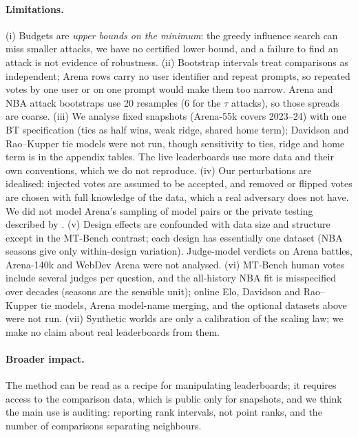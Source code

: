 \documentclass{article}
\begin{document}
\paragraph{Limitations.}
(i) Budgets are \emph{upper bounds on the minimum}: the greedy influence search can miss smaller attacks, we have no certified lower bound, and a failure to find an attack is not evidence of robustness.
(ii) Bootstrap intervals treat comparisons as independent; Arena rows carry no user identifier and repeat prompts, so repeated votes by one user or on one prompt would make them too narrow. Arena and NBA attack bootstraps use 20 resamples (6 for the $\tau$ attacks), so those spreads are coarse.
(iii) We analyse fixed snapshots (Arena-55k covers 2023--24) with one BT specification (ties as half wins, weak ridge, shared home term); Davidson and Rao--Kupper tie models were not run, though sensitivity to ties, ridge and home term is in the appendix tables. The live leaderboards use more data and their own conventions, which we do not reproduce.
(iv) Our perturbations are idealised: injected votes are assumed to be accepted, and removed or flipped votes are chosen with full knowledge of the data, which a real adversary does not have. We did not model Arena's sampling of model pairs or the private testing described by \citet{singh2025illusion}.
(v) Design effects are confounded with data size and structure except in the MT-Bench contrast; each design has essentially one dataset (NBA seasons give only within-design variation). Judge-model verdicts on Arena battles, Arena-140k and WebDev Arena were not analysed.
(vi) MT-Bench human votes include several judges per question, and the all-history NBA fit is misspecified over decades (seasons are the sensible unit); online Elo, Davidson and Rao--Kupper tie models, Arena model-name merging, and the optional datasets above were not run.
(vii) Synthetic worlds are only a calibration of the scaling law; we make no claim about real leaderboards from them.

\paragraph{Broader impact.}
The method can be read as a recipe for manipulating leaderboards; it requires access to the comparison data, which is public only for snapshots, and we think the main use is auditing: reporting rank intervals, not point ranks, and the number of comparisons separating neighbours.



\end{document}
